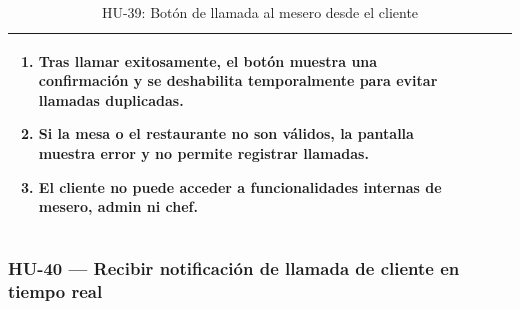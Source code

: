 \begin{table}[H]
\begin{tabularx}{\textwidth}{|>{\bfseries}p{3.5cm}|X|>{\bfseries}p{3.5cm}|X|}
{\begin{enumerate}[leftmargin=1.5em, itemsep=0pt, parsep=2pt, topsep=0pt]
    \item Tras llamar exitosamente, el botón muestra una confirmación y se deshabilita temporalmente para evitar llamadas duplicadas.
    \item Si la mesa o el restaurante no son válidos, la pantalla muestra error y no permite registrar llamadas.
    \item El cliente no puede acceder a funcionalidades internas de mesero, admin ni chef.
  \end{enumerate}
} \\
\hline
\end{tabularx}
\caption{HU-39: Botón de llamada al mesero desde el cliente}
\end{table}

\subsubsection*{HU-40 — Recibir notificación de llamada de cliente en tiempo real}
